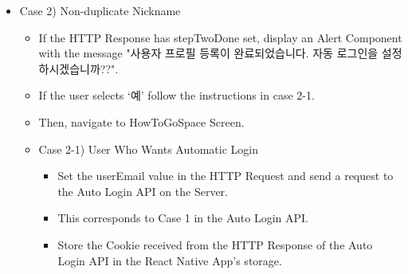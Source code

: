\documentclass[conference]{IEEEtran}
\begin{document}
\begin{itemize}
\begin{itemize}
\begin{itemize}
        \end{itemize}
        \item Case 2) Non-duplicate Nickname
        \begin{itemize}
            \item If the HTTP Response has stepTwoDone set, display an Alert Component with the message "사용자 프로필 등록이 완료되었습니다. 자동 로그인을 설정하시겠습니까??".
            \item If the user selects ‘예’ follow the instructions in case 2-1.
            \item Then, navigate to HowToGoSpace Screen.
            \item Case 2-1) User Who Wants Automatic Login
            \begin{itemize}
                \item Set the userEmail value in the HTTP Request and send a request to the Auto Login API on the Server. 
                \item This corresponds to Case 1 in the Auto Login API.
                \item Store the Cookie received from the HTTP Response of the Auto Login API in the React Native App's storage.
                \\
            \end{itemize}
        \end{itemize}
    \end{itemize}
\end{itemize}
\end{document}
